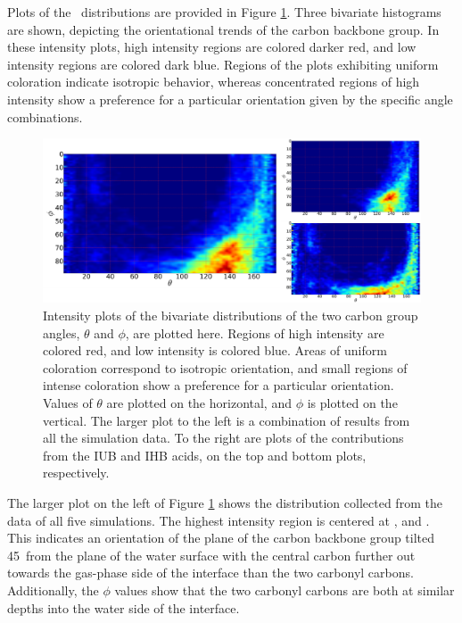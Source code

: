 Plots of the \thetaphi~distributions are provided in Figure \ref{fig:theta-phi}. Three bivariate histograms are shown, depicting the orientational trends of the carbon backbone group. In these intensity plots, high intensity regions are colored darker red, and low intensity regions are colored dark blue. Regions of the plots exhibiting uniform coloration indicate isotropic behavior, whereas concentrated regions of high intensity show a preference for a particular orientation given by the specific angle combinations.

\begin{figure}[h!]
	\begin{center}
		\includegraphics[scale=1.0]{images/orientation/theta-phi.png}
		\caption{Intensity plots of the bivariate distributions of the two carbon group angles, $\theta$ and $\phi$, are plotted here. Regions of high intensity are colored red, and low intensity is colored blue. Areas of uniform coloration correspond to isotropic orientation, and small regions of intense coloration show a preference for a particular orientation. Values of $\theta$ are plotted on the horizontal, and $\phi$ is plotted on the vertical. The larger plot to the left is  a combination of results from all the simulation data. To the right are plots of the contributions from the IUB and IHB acids, on the top and bottom plots, respectively.}
		\label{fig:theta-phi}
	\end{center}
\end{figure}


The larger plot on the left of Figure \ref{fig:theta-phi} shows the distribution collected from the data of all five simulations. The highest intensity region is centered at \degr, and \degr. This indicates an orientation of the plane of the carbon backbone group tilted 45\degr~from the plane of the water surface with the central carbon further out towards the gas-phase side of the interface than the two carbonyl carbons. Additionally, the $\phi$ values show that the two carbonyl carbons are both at similar depths into the water side of the interface.

